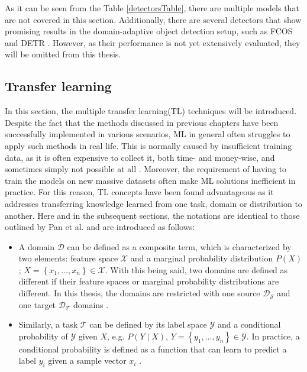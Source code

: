 \documentclass[english, 12pt, a4paper, elec, utf8, a-1b, online]{aaltothesis}
\begin{document}
As it can be seen from the Table \ref{detectorsTable}, there are multiple models that are not covered in this section. Additionally, there are several detectors that show promising results in the domain-adaptive object detection setup, such as FCOS \cite{Tian2019} and DETR \cite{Zhang2021b}. However, as their performance is not yet extensively evaluated, they will be omitted from this thesis. 


\subsection{Transfer learning}
\label{transferLearning} 
In this section, the multiple transfer learning(TL) techniques will be introduced. Despite the fact that the methods discussed in previous chapters have been successfully implemented in various scenarios, ML in general often struggles to apply such methods in real life. This is normally caused by insufficient training data, as it is often expensive to collect it, both time- and money-wise, and sometimes simply not possible at all \cite{Zhuang2019}. Moreover, the requirement of having to train the models on new massive datasets often make ML solutions inefficient in practice. For this reason, TL concepts have been found advantageous as it addresses transferring knowledge learned from one task, domain or distribution to another. Here and in the subsequent sections, the notations are identical to those outlined by Pan et al. \cite{Pan2010} and are introduced as follows:  


\begin{itemize}
\item A domain $\mathcal{D}$ can be defined as a composite term, which is characterized by two elements: feature space $\mathcal{X}$ and a marginal probability distribution $P(X)$; $X=\left\{x_{1}, \ldots, x_{n}\right\} \in \mathcal{X}$. With this being said, two domains are defined as different if their feature spaces or marginal probability distributions are different. In this thesis, the domains are restricted with one source $\mathcal{D_S}$ and one target $\mathcal{D_T}$ domains \cite{Pan2010}. 
\item Similarly, a task $\mathcal{T}$ can be defined by its label space $\mathcal{Y}$ and a conditional probability of $\mathcal{Y}$ given $X$, e.g. $P(Y \mid X)$, $Y=\left\{y_{1}, \ldots, y_{n}\right\} \in \mathcal{Y}$. In practice, a conditional probability is defined as a function that can learn to predict a label $y_i$ given a sample vector $x_i$ \cite{Pan2010}. 
\end{itemize} 
\end{document}
